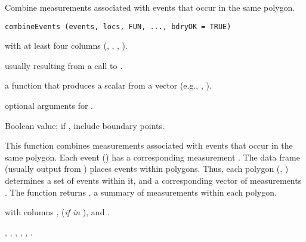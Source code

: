 \documentclass[letterpaper]{book}
\begin{document}
%
\begin{Description}\relax
Combine measurements associated with events that occur in the same
polygon.
\end{Description}
%
\begin{Usage}
\begin{verbatim}
combineEvents (events, locs, FUN, ..., bdryOK = TRUE)
\end{verbatim}
\end{Usage}
%
\begin{Arguments}
\begin{ldescription}
\item[\code{events}]  with at least four columns (,
, , ).
\item[\code{locs}]  usually resulting from a call to
.
\item[\code{FUN}] a function that produces a scalar from a vector
(e.g., , ).
\item[\code{...}] optional arguments for .
\item[\code{bdryOK}] Boolean value; if , include boundary points.
\end{ldescription}
\end{Arguments}
%
\begin{Details}\relax
This function combines measurements associated with events that occur
in the same polygon.  Each event () has a corresponding
measurement .  The  data frame (usually output from
) places events within polygons.  Thus, each
polygon (, ) determines a set of events within it,
and a corresponding vector of measurements .  The function
returns , a summary of measurements within each polygon.
\end{Details}
%
\begin{Value}
 with columns ,  (\emph{if in}
), and .
\end{Value}
%
\begin{SeeAlso}\relax
{},
,
,
,
,
.
\end{SeeAlso}
\end{document}
